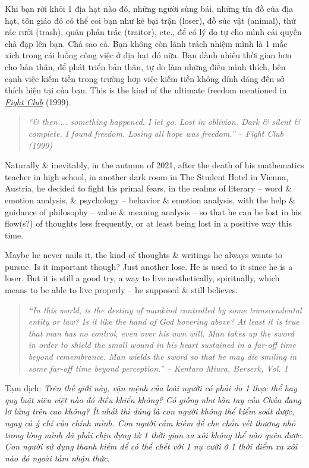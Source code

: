 \documentclass[12pt]{article}
\begin{document}
Khi bạn rời khỏi 1 địa hạt nào đó, những người sùng bái, những tín đồ của địa hạt, tôn giáo đó có thể coi bạn như kẻ bại trận (loser), đồ súc vật (animal), thứ rác rưởi (trash), quân phản trắc (traitor), etc., để có lý do tự cho mình cái quyền chà đạp lên bạn. Chả sao cả. Bạn không còn lãnh trách nhiệm mình là 1 mắc xích trong cái luồng công việc ở địa hạt đó nữa. Bạn dành nhiều thời gian hơn cho bản thân, để phát triển bản thân, tự do làm những điều mình thích, bên cạnh việc kiếm tiền trong trường hợp việc kiếm tiền không dính dáng đến sở thích hiện tại của bạn. This is the kind of the ultimate freedom mentioned in \href{https://www.imdb.com/title/tt0137523}{\it Fight Club} (1999).
\begin{quotation}\it
	``\& then $\ldots$ something happened. I let go. Lost in oblivion. Dark \& silent \& complete. I found freedom. Losing all hope was freedom.'' -- Fight Club (1999)
\end{quotation}
Naturally \& inevitably, in the autumn of 2021, after the death of his mathematics teacher in high school, in another dark room in The Student Hotel in Vienna, Austria, he decided to fight his primal fears, in the realms of literary -- word \& emotion analysis, \& psychology -- behavior \& emotion analysis, with the help \& guidance of philosophy -- value \& meaning analysis -- so that he can be lost in his flow(s?) of thoughts less frequently, or at least being lost in a positive way this time.

Maybe he never nails it, the kind of thoughts \& writings he always wants to pursue. Is it important though? Just another lose. He is used to it since he is a loser. But it is still a good try, a way to live aesthetically, spiritually, which means to be able to live properly -- he supposed \& still believes.

\begin{quotation}\it
	``In this world, is the destiny of mankind controlled by some transcendental entity or law? Is it like the hand of God hovering above? At least it is true that man has no control, even over his own will. Man takes up the sword in order to shield the small wound in his heart sustained in a far-off time beyond remembrance. Man wields the sword so that he may die smiling in some far-off time beyond perception.'' -- {\sc Kentaro Miura}, {\it Berserk}, Vol. 1
\end{quotation}
Tạm dịch: {\it Trên thế giới này, vận mệnh của loài người có phải do 1 thực thể hay quy luật siêu việt nào đó điều khiển không? Có giống như bàn tay của Chúa đang lơ lửng trên cao không? Ít nhất thì đúng là con người không thể kiểm soát được, ngay cả ý chí của chính mình. Con người cầm kiếm để che chắn vết thương nhỏ trong lòng mình đã phải chịu đựng từ 1 thời gian xa xôi không thể nào quên được. Con người sử dụng thanh kiếm để có thể chết với 1 nụ cười ở 1 thời điểm xa xôi nào đó ngoài tầm nhận thức}.
\end{document}
